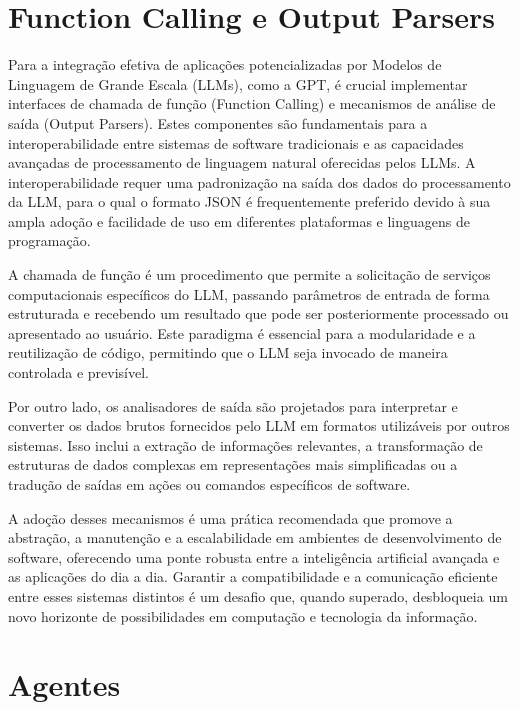 \documentclass[tcc,capa]{texufpel}
\begin{document}
\section{Function Calling e Output Parsers}

Para a integração efetiva de aplicações potencializadas por Modelos de Linguagem de Grande Escala (LLMs), como a GPT, é crucial implementar interfaces de chamada de função (Function Calling) e mecanismos de análise de saída (Output Parsers). Estes componentes são fundamentais para a interoperabilidade entre sistemas de software tradicionais e as capacidades avançadas de processamento de linguagem natural oferecidas pelos LLMs. A interoperabilidade requer uma padronização na saída dos dados do processamento da LLM, para o qual o formato JSON é frequentemente preferido devido à sua ampla adoção e facilidade de uso em diferentes plataformas e linguagens de programação.

A chamada de função é um procedimento que permite a solicitação de serviços computacionais específicos do LLM, passando parâmetros de entrada de forma estruturada e recebendo um resultado que pode ser posteriormente processado ou apresentado ao usuário. Este paradigma é essencial para a modularidade e a reutilização de código, permitindo que o LLM seja invocado de maneira controlada e previsível.

Por outro lado, os analisadores de saída são projetados para interpretar e converter os dados brutos fornecidos pelo LLM em formatos utilizáveis por outros sistemas. Isso inclui a extração de informações relevantes, a transformação de estruturas de dados complexas em representações mais simplificadas ou a tradução de saídas em ações ou comandos específicos de software.

A adoção desses mecanismos é uma prática recomendada que promove a abstração, a manutenção e a escalabilidade em ambientes de desenvolvimento de software, oferecendo uma ponte robusta entre a inteligência artificial avançada e as aplicações do dia a dia. Garantir a compatibilidade e a comunicação eficiente entre esses sistemas distintos é um desafio que, quando superado, desbloqueia um novo horizonte de possibilidades em computação e tecnologia da informação.








\section{Agentes}
\end{document}
